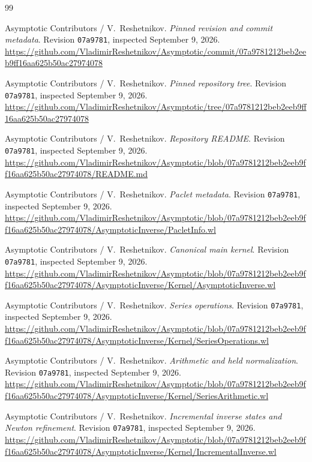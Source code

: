 \documentclass[11pt,a4paper]{article}
\theoremstyle{remark}\newtheorem{remark}[proposition]{Remark}
\begin{document}
\begin{thebibliography}{99}

\footnotesize

 Asymptotic Contributors / V.~Reshetnikov. \emph{Pinned revision and commit metadata}. Revision \texttt{07a9781}, inspected September 9, 2026. \url{https://github.com/VladimirReshetnikov/Asymptotic/commit/07a9781212beb2eeb9ff16aa625b50ac27974078}

 Asymptotic Contributors / V.~Reshetnikov. \emph{Pinned repository tree}. Revision \texttt{07a9781}, inspected September 9, 2026. \url{https://github.com/VladimirReshetnikov/Asymptotic/tree/07a9781212beb2eeb9ff16aa625b50ac27974078}

 Asymptotic Contributors / V.~Reshetnikov. \emph{Repository README}. Revision \texttt{07a9781}, inspected September 9, 2026. \url{https://github.com/VladimirReshetnikov/Asymptotic/blob/07a9781212beb2eeb9ff16aa625b50ac27974078/README.md}

 Asymptotic Contributors / V.~Reshetnikov. \emph{Paclet metadata}. Revision \texttt{07a9781}, inspected September 9, 2026. \url{https://github.com/VladimirReshetnikov/Asymptotic/blob/07a9781212beb2eeb9ff16aa625b50ac27974078/AsymptoticInverse/PacletInfo.wl}

 Asymptotic Contributors / V.~Reshetnikov. \emph{Canonical main kernel}. Revision \texttt{07a9781}, inspected September 9, 2026. \url{https://github.com/VladimirReshetnikov/Asymptotic/blob/07a9781212beb2eeb9ff16aa625b50ac27974078/AsymptoticInverse/Kernel/AsymptoticInverse.wl}

 Asymptotic Contributors / V.~Reshetnikov. \emph{Series operations}. Revision \texttt{07a9781}, inspected September 9, 2026. \url{https://github.com/VladimirReshetnikov/Asymptotic/blob/07a9781212beb2eeb9ff16aa625b50ac27974078/AsymptoticInverse/Kernel/SeriesOperations.wl}

 Asymptotic Contributors / V.~Reshetnikov. \emph{Arithmetic and held normalization}. Revision \texttt{07a9781}, inspected September 9, 2026. \url{https://github.com/VladimirReshetnikov/Asymptotic/blob/07a9781212beb2eeb9ff16aa625b50ac27974078/AsymptoticInverse/Kernel/SeriesArithmetic.wl}

 Asymptotic Contributors / V.~Reshetnikov. \emph{Incremental inverse states and Newton refinement}. Revision \texttt{07a9781}, inspected September 9, 2026. \url{https://github.com/VladimirReshetnikov/Asymptotic/blob/07a9781212beb2eeb9ff16aa625b50ac27974078/AsymptoticInverse/Kernel/IncrementalInverse.wl}


\end{thebibliography}
\end{document}
